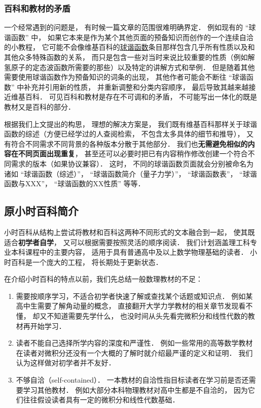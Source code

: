 \subsubsection{百科和教材的矛盾}
一个经常遇到的问题是， 有时候一篇文章的范围很难明确界定． 例如现有的 “球谐函数” 中， 如果它本来是作为某个其他页面的预备知识而创作的一个连续自洽的小教程， 它可能不会像维基百科的\href{https://en.wikipedia.org/wiki/Spherical_harmonics}{球谐函数}条目那样包含几乎所有性质以及和其他众多特殊函数的关系， 而只是包含一些对当时来说比较重要的性质（例如解氢原子的定态波函数所需要的那些）以及特定的讲解方式和举例． 但是随着其他需要使用球谐函数作为预备知识的词条的出现， 其他作者可能会不断往 “球谐函数” 中补充并引用新的性质， 并重新调整和分类内容顺序， 最后导致其越来越接近维基百科． 可见百科和教材是存在不可调和的矛盾， 不可能写出一体化的既是教材又是百科的部分．

根据我们上文提出的构思， 理想的解决方案是， 我们既有维基百科那样关于球谐函数的综述（方便已经学过的人查阅检索， 不包含太多具体的细节和推导）， 又有符合不同需求不同背景的各种版本分散于其他部分． 我们也\textbf{无需避免相似的内容在不同页面出现重复}， 甚至还可以必要时把已有内容稍作修改创建一个符合不同需求的版本（如果协议兼容）． 这时， 不同的球谐函数页面就会分别被命名为诸如 “球谐函数（综述）”， “球谐函数简介（量子力学）”， “球谐函数表”， “球谐函数与XXX”， “球谐函数的XX性质” 等等．

\subsection{原小时百科简介}\label{about_sub1}

小时百科从结构上尝试将教材和百科这两种不同形式的文本融合到一起， 使其既适合\textbf{初学者自学}， 又可以根据需要按照灵活的顺序阅读． 我们计划涵盖理工科专业本科课程中的主要内容， 适用于具有普通高中及以上数学物理基础的读者． 小时百科是一个庞大的工程， 将长期处于更新状态．

在介绍小时百科的特点以前，我们先总结一般数理教材的不足：
\begin{enumerate}
\item 需要按顺序学习，不适合初学者快速了解或查找某个话题或知识点． 例如某高中生需要了解角动量的概念， 直接翻开大学力学教材的相关章节发现看不懂， 却又不知道需要先学什么， 也没时间从头先看完微积分和线性代数的教材再开始学习．
\item 读者不能自己选择所学内容的深度和严谨性． 例如一些常用的高等数学教材在读者对微积分还没有一个大概的了解时就介绍最严谨的定义和证明． 我们认为这样做对初学者并不友好．
\item 不够自洽（self-contained）． 一本教材的自洽性指目标读者在学习前是否还需要学习其他教材． 例如大部分本科物理教材对高中生都是不自洽的， 因为它们往往假设读者具有一定的微积分和线性代数基础．
\end{enumerate}


